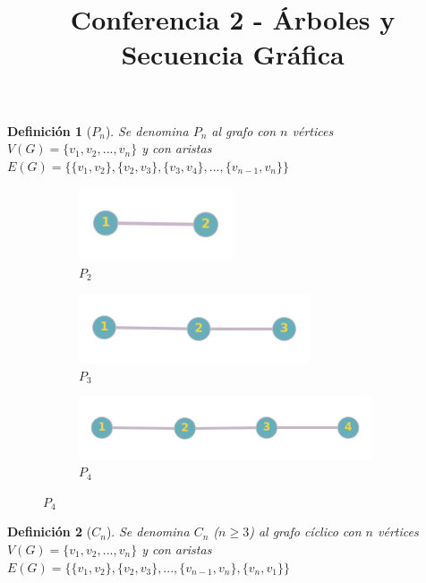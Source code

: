 \documentclass[a4paper,1pt]{report}
\title{Conferencia 2 - \'Arboles y Secuencia Gr\'afica}
\author{}
\newtheorem*{dfn}{Definición}
\begin{document}
\maketitle


\begin{dfn}[$P_n$]
    Se denomina $P_n$ al grafo con $n$ v\'ertices $V(G)= \{v_1, v_2,..., v_n\}$ y con aristas $E(G) = \{\{v_1, v_2\},\{v_2, v_3\}, \{v_3, v_4\},...,\{v_{n-1}, v_{n}\} \}$ 
\end{dfn}

\begin{figure}[H]
    \centering
    \begin{subfigure}[b]{0.30\textwidth}
    \centering
    \includegraphics[width=0.5\textwidth]{figures2/P2.png}
    \caption{$P_2$}
    \end{subfigure}
    \begin{subfigure}[b]{0.30\textwidth}
        \centering
    \includegraphics[width=0.75\textwidth]{figures2/P3.png}
    \caption{$P_3$}
    \end{subfigure}
    \begin{subfigure}[b]{0.30\textwidth}
        \centering
    \includegraphics[width=0.95\textwidth]{figures2/P4.png}
    \caption{$P_4$}
    \end{subfigure}
\end{figure} 

\begin{dfn}[$C_n$]
    Se denomina $C_n$ ($n \geq 3$) al grafo c\'iclico con $n$ v\'ertices $V(G)= \{v_1, v_2,..., v_n\}$  y con aristas $E(G) = \{\{v_1, v_2\},\{v_2, v_3\},...,\{v_{n-1}, v_{n}\}, \{v_{n}, v_{1}\}\}$ 
\end{dfn}
\end{document}
